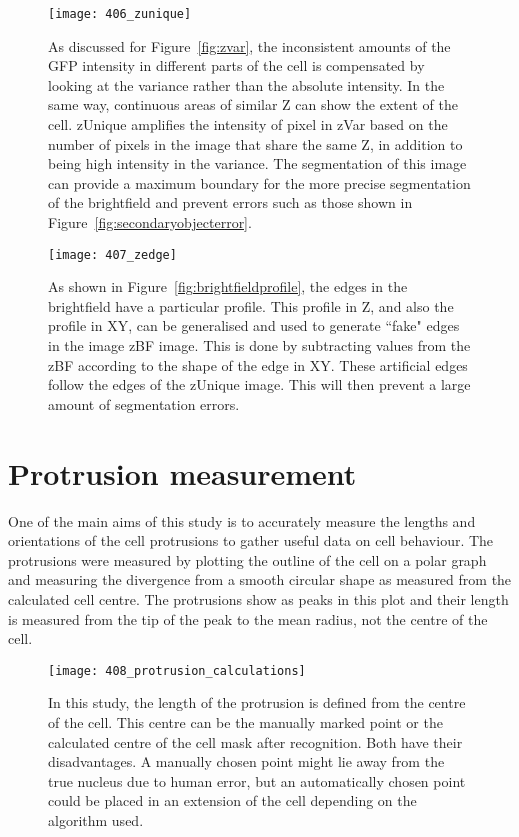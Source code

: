 \begin{figure}[h!]
 \centering
 \texttt{[image: 406\_zunique]}
 \caption[zUnique example]{
 	As discussed for Figure~\ref{fig:zvar}, the inconsistent amounts of the GFP intensity in different parts of the cell is compensated by looking at the variance rather than the absolute intensity. In the same way, continuous areas of similar Z can show the extent of the cell. zUnique amplifies the intensity of pixel in zVar based on the number of pixels in the image that share the same Z, in addition to being high intensity in the variance. The segmentation of this image can provide a maximum boundary for the more precise segmentation of the brightfield and prevent errors such as those shown in Figure~\ref{fig:secondaryobjecterror}.
 }
 \label{fig:zunique}
\end{figure}

\begin{figure}[h!]
 \centering
 \texttt{[image: 407\_zedge]}
 \caption[zEdge example]{
 	As shown in Figure~\ref{fig:brightfieldprofile}, the edges in the brightfield have a particular profile. This profile in Z, and also the profile in XY, can be generalised and used to generate ``fake" edges in the image zBF image. This is done by subtracting values from the zBF according to the shape of the edge in XY. These artificial edges follow the edges of the zUnique image. This will then prevent a large amount of segmentation errors.
 }
 \label{fig:zedge}
\end{figure}

\section{Protrusion measurement}

One of the main aims of this study is to accurately measure the lengths and orientations of the cell protrusions to gather useful data on cell behaviour. The protrusions were measured by plotting the outline of the cell on a polar graph and measuring the divergence from a smooth circular shape as measured from the calculated cell centre. The protrusions show as peaks in this plot and their length is measured from the tip of the peak to the mean radius, not the centre of the cell.

\begin{figure}[h!]
 \centering
 \texttt{[image: 408\_protrusion\_calculations]}
 \caption[Protrusion calulation]{
 	In this study, the length of the protrusion is defined from the centre of the cell. This centre can be the manually marked point or the calculated centre of the cell mask after recognition. Both have their disadvantages. A manually chosen point might lie away from the true nucleus due to human error, but an automatically chosen point could be placed in an extension of the cell depending on the algorithm used.
 }
 \label{fig:protrusioncalc}
\end{figure}

